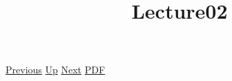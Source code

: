 \documentclass[12pt,a4paper]{report}
\begin{document}
 \href{doc/phil/People/Brandom/Antirepresentationalism/Lecture01.html}{Previous} 
 \href{doc/phil/People/Brandom/Antirepresentationalism.html}{Up} 
 \href{doc/phil/People/Brandom/Antirepresentationalism/Lecture03.html}{Next} 
 \href{doc/phil/People/Brandom/Antirepresentationalism/Lecture02.pdf}{PDF} 
\title{Lecture02}

\tableofcontents
\end{document}
